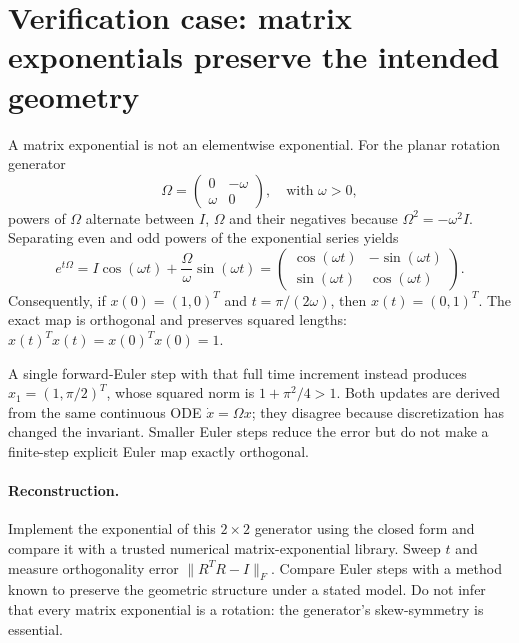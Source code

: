 \clearpage
\section*{Verification case: matrix exponentials preserve the intended geometry}
\noindent A matrix exponential is not an elementwise exponential.
For the planar rotation generator
\[
\Omega=\begin{pmatrix}0&-\omega\\\omega&0\end{pmatrix},
\quad\text{with }\omega>0,
\]
powers of \(\Omega\) alternate between \(I\), \(\Omega\)
and their negatives because \(\Omega^2=-\omega^2I\).
Separating even and odd powers of the exponential series yields
\[
e^{t\Omega}
=I\cos(\omega t)+\frac{\Omega}{\omega}\sin(\omega t)
=\begin{pmatrix}\cos(\omega t)&-\sin(\omega t)\\
\sin(\omega t)&\cos(\omega t)\end{pmatrix}.
\]
Consequently, if \(x(0)=(1,0)^T\) and
\(t=\pi/(2\omega)\), then \(x(t)=(0,1)^T\).
The exact map is orthogonal and preserves squared lengths:
\(x(t)^Tx(t)=x(0)^Tx(0)=1\).

A single forward-Euler step with that full time increment instead
produces \(x_1=(1,\pi/2)^T\), whose squared norm is
\(1+\pi^2/4>1\). Both updates are derived from the same continuous
ODE \(\dot x=\Omega x\); they disagree because discretization has
changed the invariant. Smaller Euler steps reduce the error but do
not make a finite-step explicit Euler map exactly orthogonal.

\paragraph{Reconstruction.}
Implement the exponential of this \(2\times2\) generator using the
closed form and compare it with a trusted numerical matrix-exponential
library. Sweep \(t\) and measure orthogonality error
\(\lVert R^TR-I\rVert_F\). Compare Euler steps with a method known
to preserve the geometric structure under a stated model.
Do not infer that every matrix exponential is a rotation:
the generator's skew-symmetry is essential.
